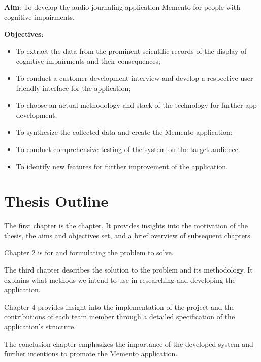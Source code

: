     \textbf{Aim}:
To develop the audio journaling application Memento for people with cognitive impairments.

\textbf{Objectives}:
\begin{itemize}
\item To extract the data from the prominent scientific records of the display of cognitive impairments and their consequences;
\item To conduct a customer development interview and develop a respective user-friendly interface for the application;
\item To choose an actual methodology and stack of the technology for further app development;
\item To synthesize the collected data and create the Memento application;
\item To conduct comprehensive testing of the system on the target audience.
\item To identify new features for further improvement of the application.
\end{itemize}

\section{Thesis Outline}
The first chapter is the  chapter. It provides insights into the motivation of the thesis, the aims and objectives set, and a brief overview of subsequent chapters.

Chapter 2 is for  and formulating the problem to solve.

The third chapter describes the solution to the problem and its methodology. It explains what methods we intend to use in researching and developing the application.

Chapter 4 provides insight into the implementation of the project and the contributions of each team member through a detailed specification of the application's structure.

The conclusion chapter emphasizes the importance of the developed system and further intentions to promote the Memento application.
